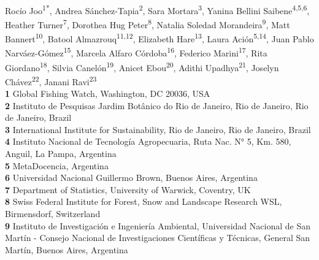 \documentclass[10pt,letterpaper]{article}
\begin{document}
\vspace*{0.2in}

\begin{flushleft}
{\Large
\textbf{} %
}
\newline
\\
Rocío Joo\textsuperscript{1*\Yinyang}, 
Andrea Sánchez-Tapia\textsuperscript{2\Yinyang},
Sara Mortara\textsuperscript{3},
Yanina Bellini Saibene\textsuperscript{4,5,6},
Heather Turner\textsuperscript{7}, %
Dorothea Hug Peter\textsuperscript{8}, %
Natalia Soledad Morandeira\textsuperscript{9},
Matt Bannert\textsuperscript{10},
Batool Almazrouq\textsuperscript{11,12},
Elizabeth Hare\textsuperscript{13},
Laura Ación\textsuperscript{5,14},
Juan Pablo Narváez-Gómez\textsuperscript{15},
Marcela Alfaro Córdoba\textsuperscript{16},
Federico Marini\textsuperscript{17},
Rita Giordano\textsuperscript{18},
Silvia Canelón\textsuperscript{19},
Anicet Ebou\textsuperscript{20},
Adithi Upadhya\textsuperscript{21},
Joselyn Chávez\textsuperscript{22},
Janani Ravi\textsuperscript{23}
\\
\bigskip
\textbf{1} Global Fishing Watch, Washington, DC 20036, USA
\\
\textbf{2} Instituto de Pesquisas Jardim Botânico do Rio de Janeiro, Rio de Janeiro, Rio de Janeiro, Brazil
\\
\textbf{3} International Institute for Sustainability, Rio de Janeiro, Rio de Janeiro, Brazil
\\
\textbf{4} Instituto Nacional de Tecnología Agropecuaria, Ruta Nac. N° 5, Km. 580, Anguil, La Pampa, Argentina
\\
\textbf{5} MetaDocencia, Argentina
\\
\textbf{6} Universidad Nacional Guillermo Brown, Buenos Aires, Argentina
\\
\textbf{7} Department of Statistics, University of Warwick, Coventry, UK
\\
\textbf{8} Swiss Federal Institute for Forest, Snow and Landscape Research WSL, Birmensdorf, Switzerland
\\
\textbf{9} Instituto de Investigación e Ingeniería Ambiental, Universidad Nacional de San Martín - Consejo Nacional de Investigaciones Científicas y Técnicas, General San Martín, Buenos Aires, Argentina

\end{flushleft}
\end{document}
